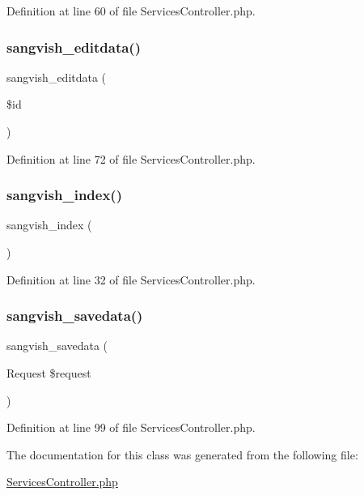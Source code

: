 Definition at line 60 of file Services\+Controller.\+php.

\mbox{\label{class_responsive_1_1_http_1_1_controllers_1_1_services_controller_a630f91fa525b55af595df8a2fbf882d4}} 
\subsubsection{\texorpdfstring{sangvish\_editdata()}{sangvish\_editdata()}}
{\footnotesize\ttfamily sangvish\+\_\+editdata (\begin{DoxyParamCaption}\item[{}]{\$id }\end{DoxyParamCaption})}



Definition at line 72 of file Services\+Controller.\+php.

\mbox{\label{class_responsive_1_1_http_1_1_controllers_1_1_services_controller_a102ddc90c5f30fa7831dcf999b905ad1}} 
\subsubsection{\texorpdfstring{sangvish\_index()}{sangvish\_index()}}
{\footnotesize\ttfamily sangvish\+\_\+index (\begin{DoxyParamCaption}{ }\end{DoxyParamCaption})}



Definition at line 32 of file Services\+Controller.\+php.

\mbox{\label{class_responsive_1_1_http_1_1_controllers_1_1_services_controller_a63d8d498a130e9f530dd9de0247a0c74}} 
\subsubsection{\texorpdfstring{sangvish\_savedata()}{sangvish\_savedata()}}
{\footnotesize\ttfamily sangvish\+\_\+savedata (\begin{DoxyParamCaption}\item[{Request}]{\$request }\end{DoxyParamCaption})\hspace{0.3cm}{\ttfamily [protected]}}



Definition at line 99 of file Services\+Controller.\+php.



The documentation for this class was generated from the following file\+:\begin{DoxyCompactItemize}
\item 
\mbox{\hyperlink{_services_controller_8php}{Services\+Controller.\+php}}\end{DoxyCompactItemize}
